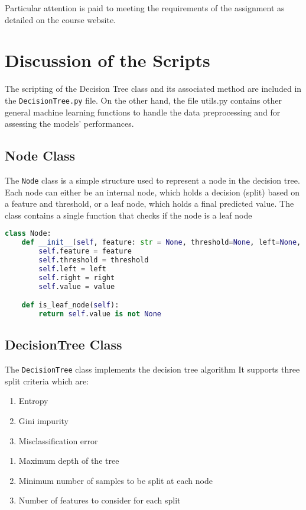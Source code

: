 \documentclass{article}
\begin{document}
Particular attention is paid to meeting the requirements of the assignment as detailed on the course website.

\section{Discussion of the Scripts}
The scripting of the Decision Tree class and its associated method are included in the \texttt{DecisionTree.py} file. On the other hand, the file utils.py contains other general machine learning functions to handle the data preprocessing and for assessing the models' performances.

\subsection{Node Class}
The \texttt{Node} class is a simple structure used to represent a node in the decision tree. Each node can either be an internal node, which holds a decision (split) based on a feature and threshold, or a leaf node, which holds a final predicted value. The class contains a single function that checks if the node is a leaf node

\begin{lstlisting}[language=Python, caption=Node Class]
class Node:
    def __init__(self, feature: str = None, threshold=None, left=None, right=None, *, value=None):
        self.feature = feature
        self.threshold = threshold
        self.left = left
        self.right = right
        self.value = value

    def is_leaf_node(self):
        return self.value is not None
\end{lstlisting}

\subsection{DecisionTree Class}
The \texttt{DecisionTree} class implements the decision tree algorithm It supports three split criteria which are:
\begin{enumerate}
    \item Entropy
    \item Gini impurity
    \item Misclassification error
\end{enumerate}

\begin{enumerate}
    \item Maximum depth of the tree
    \item Minimum number of samples to be split at each node
    \item Number of features to consider for each split
\end{enumerate}
\end{document}
